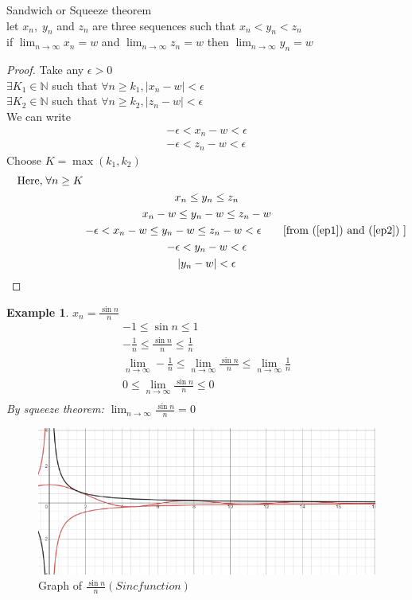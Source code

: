 \documentclass{article}
\newtheorem{example}{Example}[section]
\newcommand{\hs}{\hspace}
\begin{document}
\begin{theorem}{Sandwich or Squeeze theorem}\\
    let $x_n,\; y_n$ and $z_n$ are three sequences such that $x_n<y_n<z_n$\\
    if $\lim_{n\to\infty}x_n=w$ and $\lim_{n\to\infty}z_n=w$ then $\lim_{n\to\infty}y_n=w$
\begin{proof}
    Take any $\epsilon >0$\\
    $\exists K_1 \in \mathbb{N}$\; such that $\forall n \geq k_1, |x_n-w|<\epsilon$\\
    $\exists K_2 \in \mathbb{N}$\; such that $\forall n \geq k_2, |z_n-w|<\epsilon$\\
    We can write
    \begin{align}
        \label{ep1} -\epsilon<x_n-w<\epsilon \\
        \label{ep2} -\epsilon<z_n-w<\epsilon
    \end{align}
    Choose $K=\max(k_1,k_2)$\\
    \begin{gather*}
        \text{Here,\;}\forall n \geq K    \hs{10cm} \\
        x_n\leq y_n \leq z_n                 \\
        x_n-w\leq y_n -w\leq z_n-w                   \\
        \hs{2.5cm}-\epsilon<x_n-w\leq y_n -w\leq z_n-w<\epsilon \qquad \text{[from (\ref{ep1}) and (\ref{ep2}) ]}  \\
        -\epsilon< y_n-w<\epsilon  \\
        |y_n -w|<\epsilon
    \end{gather*}
\end{proof}
\end{theorem}
\begin{example}
    $x_n=\displaystyle\frac{\sin{n}}{n}$
    \begin{gather*}
        -1\leq \sin{n} \leq 1 \\
        -\frac{1}{n}\leq \frac{\sin n}{n}\leq \frac{1}{n}\\
        \lim_{n\to\infty}-\frac{1}{n}\leq \lim_{n\to\infty}\frac{\sin n}{n}\leq\lim_{n\to\infty} \frac{1}{n}\\
        0\leq \lim_{n\to\infty}\frac{\sin n}{n}\leq 0\\
    \end{gather*}
    By squeeze theorem: $\displaystyle\lim_{n\to\infty}\frac{\sin n}{n}=0$
\end{example}
\begin{figure}
    \centering
    \includegraphics{sin(n)n.png}
    \caption{Graph of $\frac{\sin n}{n} (Sinc function)$}
    \label{fig:mylabel}
\end{figure}
\end{document}
